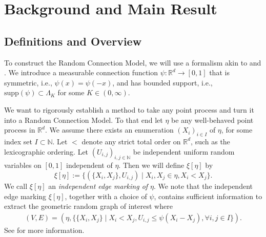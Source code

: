 \documentclass[a4paper,12pt]{scrartcl}
\newcommand{\conn}{\psi}
\newcommand{\nats}{\mathbb{N}}
\newcommand{\reals}{\mathbb{R}}
\newcommand{\set}[2]{\big\{ #1 \mid #2 \big\}}
\theoremstyle{definition}
\theoremstyle{remark}
\begin{document}
\section{Background and Main Result} \label{sec:MainRes}
\subsection{Definitions and Overview}
\label{ss:DefOver}

To construct the Random Connection Model, we will use a formalism akin to \cite{LastZiescheStationary} and \cite{lace_exp_mean}. We introduce a measurable connection function $\psi: \mathbb{R}^d \rightarrow [0,1]$ that is symmetric, i.e., $\psi(x) = \psi(-x)$, and has bounded support,
i.e., $\text{supp}(\psi) \subset \Lambda_K$ for some $K \in (0,\infty)$.

We want to rigorously establish a method to take any point process and turn it into a Random Connection Model. To that end let $\eta$ be any well-behaved point process in $\reals^d$. We assume there exists an enumeration $(X_i)_{i \in I}$ of $\eta$, for some index set $I \subset \mathbb N$.
Let $<$ denote any strict total order on $\reals^d$, such as the lexicographic ordering. Let $(U_{i,j})_{i, j\in \nats}$ be independent uniform random variables on $[0, 1]$ independent of $\eta$. Then we will define $\xi[\eta]$ by
\begin{equation}
  \xi[\eta] := \big\{
    (\{X_i, X_j\}, U_{i,j})
    \mid
    X_i, X_j\in \eta,
    X_i<X_j
  \big\}.
\end{equation}
We call $\xi[\eta]$ an \emph{independent edge marking of $\eta$}. We note that the independent edge marking $\xi[\eta]$, together with a choice of $\conn$, contains sufficient information to extract the geometric random graph of interest where
\begin{equation}
  \begin{aligned}
    (V, E)
    =
    (
      \eta,
      \set
      {\{X_i, X_j\}}
      {X_i<X_j, U_{i,j}\leq \conn(X_i-X_j), \forall i,j\in I %
    })
    .
  \end{aligned}
\end{equation}
See \cite{lace_exp_mean} for more information.
\end{document}

